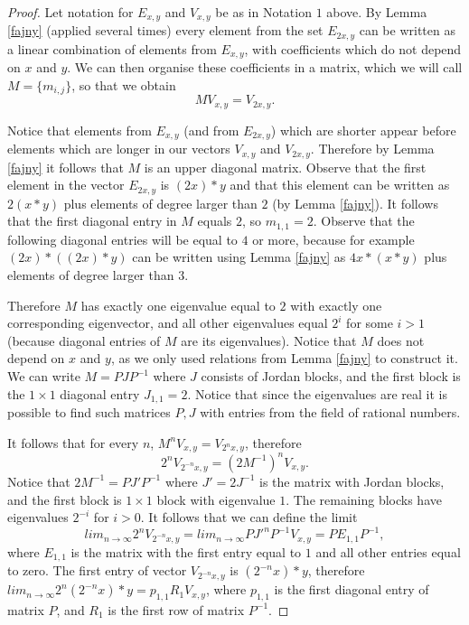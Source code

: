 \documentclass[12pt]{article}
\begin{document}
\begin{proof}  Let notation for $E_{x,y}$ and $V_{x,y}$ be as in Notation $1$ above.
By Lemma \ref{fajny} (applied several times) every element from the set $E_{2x, y}$ can be written as a linear combination 
   of elements from $E_{x,y}$, with coefficients which do not  depend on $x$ and $y$. We can then  organise these coefficients in a matrix, which we will call $M=\{m_{i,j}\}$,  so that we obtain
\[MV_{x,y}=V_{2x,y}.\]

Notice that  elements from $E_{x,y}$ (and from $E_{2x,y}$) which are shorter appear before elements which are longer in our vectors $V_{x,y}$ and $V_{2x, y}$. Therefore by Lemma \ref{fajny} it follows that $M$ is an  upper diagonal matrix. Observe that the first element in the  vector  
 $E_{2x,y}$ is $(2x)*y$  and that this element can be written as $2(x*y)$ plus  elements of degree larger than $2$ (by  Lemma \ref{fajny}). It follows that the first diagonal entry in $M$ equals $2$, so $m_{1, 1}=2$. 
Observe that the following diagonal entries will be equal to $4$ or more, because 
 for example $(2x)*((2x)*y)$ can be written using Lemma \ref{fajny} as $4x*(x*y)$ plus  elements of degree larger than $3$.

Therefore $M$ has exactly one eigenvalue equal to $2$ with exactly one corresponding eigenvector,  and all other eigenvalues 
 equal $2^{i}$ for some $i>1$ (because diagonal entries of $M$ are its eigenvalues).
 Notice that $M$ does not depend on $x$ and $y$, as we only used relations from Lemma \ref{fajny} to construct it.
 We can write $M=PJP^{-1}$ where $J$ consists of Jordan blocks, and the first block is the $1\times 1$  diagonal entry $J_{1,1}=2$. Notice that since the eigenvalues are real it is possible to find such matrices $P, J$ with entries from the field of rational numbers. 

It follows that for every $n$, $M^{n}V_{x,y}=V_{2^{n}x,y}$, therefore 
\[2^{n}V_{2^{-n}x,y}=(2M^{-1})^{n}V_{x,y}.\]
Notice that $2M^{-1}=PJ'P^{-1}$ where $J'=2J^{-1}$ is the matrix with Jordan blocks, and the first block is $1\times 1$ block with eigenvalue $1$. The remaining blocks have eigenvalues $2^{-i}$ for $i>0$.
  It follows that we can define the limit 
\[lim_{n\rightarrow \infty } 2^{n}V_{2^{-n}x,y}=lim_{n\rightarrow \infty }PJ'^{n}P^{-1}V_{x,y}=PE_{1,1}P^{-1},\]
 where $E_{1,1}$ is the matrix with the first entry equal to $1$ and all other entries equal to zero.
 The first entry of vector $V_{2^{-n}x,y}$ is $(2^{-n}x)*y$, therefore 
  $lim _{n\rightarrow \infty } 2^{n}(2^{-n}x)*y=p_{1,1}R_{1}V_{x,y}$, where $p_{1,1}$ is the first diagonal entry of matrix $P$, and $R_{1}$ is the first row of matrix $P^{-1}$.
\end{proof}
\end{document}
